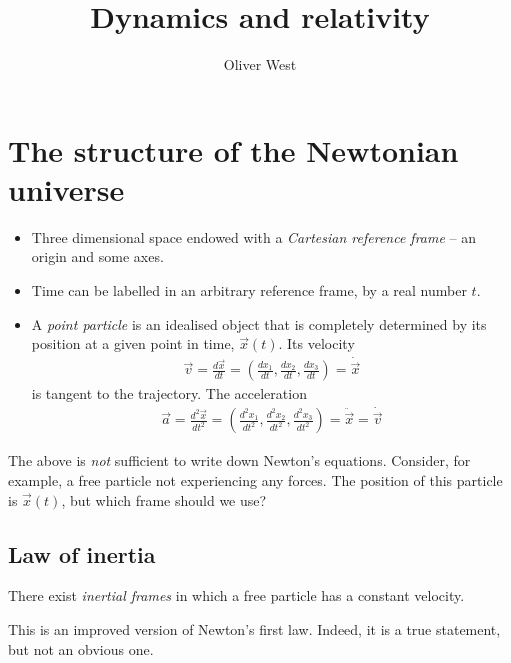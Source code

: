 \documentclass{../../template/note}
\author{Oliver West}
\title{Dynamics and relativity}
\date{}
\begin{document}
    \maketitle

    \tableofcontents


    \section{The structure of the Newtonian universe}

    \begin{itemize}
        \item Three dimensional space endowed with a \emph{Cartesian reference frame} -- an origin and some axes.
        \item Time can be labelled in an arbitrary reference frame, by a real number \(t\).
        \item A \emph{point particle} is an idealised object that is completely determined by its position at a given point in time, \(\vec x(t)\). Its velocity
        \begin{align*}
            \vec v = \frac{d \vec x}{dt} = \left(\frac{dx_1}{dt}, \frac{dx_2}{dt}, \frac{dx_3}{dt}\right) = \dot{\vec x}
        \end{align*}
        is tangent to the trajectory. The acceleration
        \begin{align*}
            \vec a = \frac{d^2\vec x}{dt^2} = \left(\frac{d^2x_1}{dt^2}, \frac{d^2x_2}{dt^2}, \frac{d^2x_3}{dt^2}\right) = \ddot{\vec x} = \dot{\vec v}
        \end{align*}
    \end{itemize}
    The above is \emph{not} sufficient to write down Newton's equations. Consider, for example, a free particle not experiencing any forces. The position of this particle is \(\vec x(t)\), but which frame should we use?
    
    \subsection{Law of inertia}

    \begin{proposition}
        There exist \emph{inertial frames} in which a free particle has a constant velocity.
    \end{proposition}
    
    This is an improved version of Newton's first law. Indeed, it is a true statement, but not an obvious one.
\end{document}
